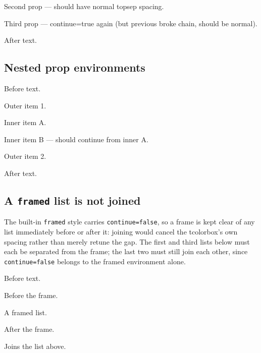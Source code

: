 \documentclass{article}
\begin{document}
\begin{prop}[continue=false]
  \item Second prop — should have normal topsep spacing.
\end{prop}

\begin{prop}
  \item Third prop — continue=true again (but previous broke chain, should be normal).
\end{prop}

After text.

\subsection{Nested prop environments}

Before text.

\begin{prop}
  \item Outer item 1.
  \begin{prop}
    \item Inner item A.
  \end{prop}
  \begin{prop}
    \item Inner item B — should continue from inner A.
  \end{prop}
  \item Outer item 2.
\end{prop}

After text.

\subsection{A \texttt{framed} list is not joined}

The built-in \texttt{framed} style carries \texttt{continue=false}, so a frame
is kept clear of any list immediately before or after it: joining would cancel
the \textsf{tcolorbox}'s own spacing rather than merely retune the gap.  The
first and third lists below must each be separated from the frame; the last two
must still join each other, since \texttt{continue=false} belongs to the framed
environment alone.

Before text.

\begin{prop}\item Before the frame.\end{prop}
\begin{prop}[style=framed]\item A framed list.\end{prop}
\begin{prop}\item After the frame.\end{prop}
\begin{prop}\item Joins the list above.\end{prop}
\end{document}
